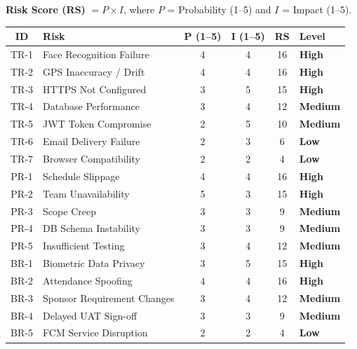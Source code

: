 \documentclass[12pt,a4paper]{article}
\begin{document}
\textbf{Risk Score (RS)} $= P \times I$, where $P$ = Probability (1--5) and $I$ = Impact (1--5).

\bigskip
\begin{center}
\small
\begin{tabular}{c l c c c l}
\toprule
\textbf{ID} & \textbf{Risk} & \textbf{P (1--5)} & \textbf{I (1--5)} & \textbf{RS} & \textbf{Level} \\
\midrule
\rowcolor{highRisk!20}
TR-1 & Face Recognition Failure & 4 & 4 & 16 & \textbf{\color{highRisk}High} \\
\rowcolor{highRisk!20}
TR-2 & GPS Inaccuracy / Drift & 4 & 4 & 16 & \textbf{\color{highRisk}High} \\
\rowcolor{highRisk!20}
TR-3 & HTTPS Not Configured & 3 & 5 & 15 & \textbf{\color{highRisk}High} \\
\rowcolor{medRisk!20}
TR-4 & Database Performance & 3 & 4 & 12 & \textbf{\color{medRisk}Medium} \\
\rowcolor{medRisk!20}
TR-5 & JWT Token Compromise & 2 & 5 & 10 & \textbf{\color{medRisk}Medium} \\
\rowcolor{lowRisk!20}
TR-6 & Email Delivery Failure & 2 & 3 & 6 & \textbf{\color{lowRisk}Low} \\
\rowcolor{lowRisk!20}
TR-7 & Browser Compatibility & 2 & 2 & 4 & \textbf{\color{lowRisk}Low} \\
\rowcolor{highRisk!20}
PR-1 & Schedule Slippage & 4 & 4 & 16 & \textbf{\color{highRisk}High} \\
\rowcolor{highRisk!20}
PR-2 & Team Unavailability & 5 & 3 & 15 & \textbf{\color{highRisk}High} \\
\rowcolor{medRisk!20}
PR-3 & Scope Creep & 3 & 3 & 9 & \textbf{\color{medRisk}Medium} \\
\rowcolor{medRisk!20}
PR-4 & DB Schema Instability & 3 & 3 & 9 & \textbf{\color{medRisk}Medium} \\
\rowcolor{medRisk!20}
PR-5 & Insufficient Testing & 3 & 4 & 12 & \textbf{\color{medRisk}Medium} \\
\rowcolor{highRisk!20}
BR-1 & Biometric Data Privacy & 3 & 5 & 15 & \textbf{\color{highRisk}High} \\
\rowcolor{highRisk!20}
BR-2 & Attendance Spoofing & 4 & 4 & 16 & \textbf{\color{highRisk}High} \\
\rowcolor{medRisk!20}
BR-3 & Sponsor Requirement Changes & 3 & 4 & 12 & \textbf{\color{medRisk}Medium} \\
\rowcolor{medRisk!20}
BR-4 & Delayed UAT Sign-off & 3 & 3 & 9 & \textbf{\color{medRisk}Medium} \\
\rowcolor{lowRisk!20}
BR-5 & FCM Service Disruption & 2 & 2 & 4 & \textbf{\color{lowRisk}Low} \\
\bottomrule
\end{tabular}
\end{center}
\end{document}
